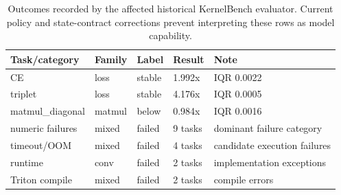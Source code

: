 \begin{table}[htbp]
\centering
\caption{Outcomes recorded by the affected historical KernelBench evaluator. Current policy and state-contract corrections prevent interpreting these rows as model capability.}
\label{tab:kernelbench-candidate-appendix}
\scriptsize
\begin{tabularx}{\linewidth}{l l l l X}
\toprule
Task/category & Family & Label & Result & Note \\
\midrule
CE & loss & stable & 1.992x & IQR 0.0022 \\
triplet & loss & stable & 4.176x & IQR 0.0005 \\
matmul\_diagonal & matmul & below & 0.984x & IQR 0.0016 \\
numeric failures & mixed & failed & 9 tasks & dominant failure category \\
timeout/OOM & mixed & failed & 4 tasks & candidate execution failures \\
runtime & conv & failed & 2 tasks & implementation exceptions \\
Triton compile & mixed & failed & 2 tasks & compile errors \\
\bottomrule
\end{tabularx}
\end{table}
